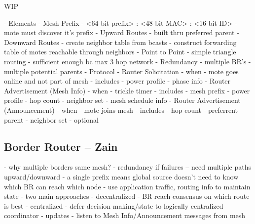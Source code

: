 WIP


- Elements
    - Mesh Prefix
        - <64 bit prefix> : <48 bit MAC> : <16 bit ID>
        - mote must discover it's prefix
    - Upward Routes
        - built thru preferred parent
    - Downward Routes
        - create neighbor table from bcasts
        - construct forwarding table of motes reachable through neighbors
    - Point to Point
        - simple triangle routing
        - sufficient enough bc max 3 hop network
    - Redundancy
        - multiple BR's
        - multiple potential parents
- Protocol
    - Router Solicitation
        - when
            - mote goes online and not part of mesh
        - includes
            - power profile
            - phase info
    - Router Advertisement (Mesh Info)
        - when
            - trickle timer
        - includes
            - mesh prefix
            - power profile
            - hop count
            - neighbor set
            - mesh schedule info
    - Router Advertisement (Announcement)
        - when
            - mote joins mesh
        - includes
            - hop count
            - preferrent parent
            - neighbor set
        - optional
\fi

\subsection{Border Router -- Zain}
\if
- why multiple borders same mesh?
    - redundancy if failures -- need multiple paths upward/downward
    - a single prefix means global source doesn't need to know which BR can reach which node
    - use application traffic, routing info to maintain state
- two main approaches
    - decentralized
        - BR reach consensus on which route is best
    - centralized
        - defer decision making/state to logically centralized coordinator
- updates
    - listen to Mesh Info/Announcement messages from mesh
\fi



